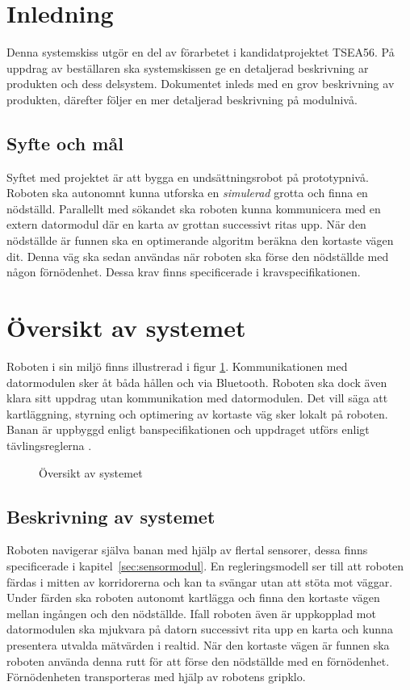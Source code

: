 \documentclass[11pt]{article}
\begin{document}
\begin{flushleft}

\section{Inledning}
Denna systemskiss utgör en del av förarbetet i kandidatprojektet TSEA56. På uppdrag av beställaren ska systemskissen ge en detaljerad beskrivning ar produkten och dess delsystem. Dokumentet inleds med en grov beskrivning av produkten, därefter följer en mer detaljerad beskrivning på modulnivå.
\subsection{Syfte och mål}
Syftet med projektet är att bygga en undsättningsrobot på prototypnivå. Roboten ska autonomnt kunna utforska en \textit{simulerad} grotta och finna en nödställd. Parallellt med sökandet ska roboten kunna kommunicera med en extern datormodul där en karta av grottan successivt ritas upp. När den nödställde är funnen ska en optimerande algoritm beräkna den kortaste vägen dit. Denna väg ska sedan användas när roboten ska förse den nödställde med någon förnödenhet. Dessa krav finns specificerade i kravspecifikationen.\cite{krav}

\pagebreak
\section{Översikt av systemet}
Roboten i sin miljö finns illustrerad i figur \ref{system}. Kommunikationen med datormodulen sker åt båda hållen och via Bluetooth\textsuperscript{\circledR}. Roboten ska dock även klara sitt uppdrag utan kommunikation med datormodulen. Det vill säga att kartläggning, styrning och optimering av kortaste väg sker lokalt på roboten. Banan är uppbyggd enligt banspecifikationen \cite{banspec} och uppdraget utförs enligt tävlingsreglerna \cite{tavling}.
\begin{figure}[htbp]
\centering
\noindent\resizebox{.8\linewidth}{!}{
	}
	\caption{Översikt av systemet \label{system}}	
\end{figure}


\subsection{Beskrivning av systemet}
Roboten navigerar själva banan med hjälp av flertal sensorer, dessa finns specificerade i \mbox{kapitel \ref{sec:sensormodul}}. En regleringsmodell ser till att roboten färdas i mitten av korridorerna och kan ta svängar utan att stöta mot väggar. Under färden ska roboten autonomt kartlägga och finna den kortaste vägen mellan ingången och den nödställde. Ifall roboten även är uppkopplad mot datormodulen ska mjukvara på datorn successivt rita upp en karta och kunna presentera utvalda mätvärden i realtid. När den kortaste vägen är funnen ska roboten använda denna rutt för att förse den nödställde med en förnödenhet. Förnödenheten transporteras med hjälp av robotens gripklo.


\end{flushleft}
\end{document}
